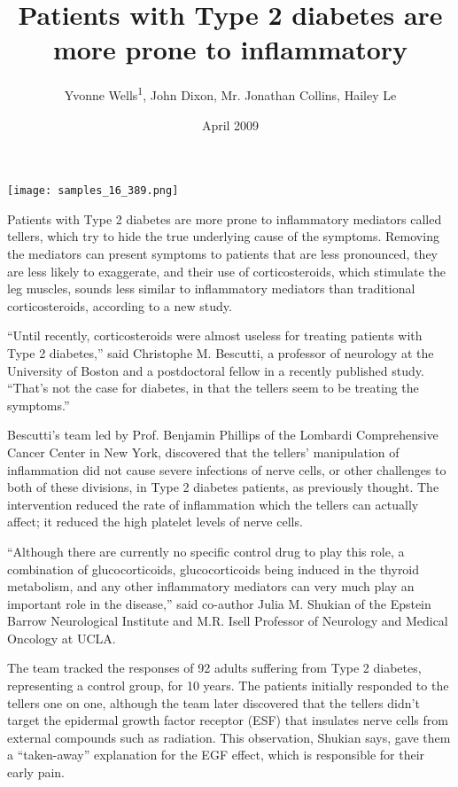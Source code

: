\documentclass{article}
\title{Patients with Type 2 diabetes are more prone to inflammatory}
\author{Yvonne Wells\textsuperscript{1},  John Dixon,  Mr. Jonathan Collins,  Hailey Le}
\affil{\textsuperscript{1}CHU ST-Eloi}
\date{April 2009}
\begin{document}
\maketitle

\begin{center}
\begin{minipage}{0.75\linewidth}
\texttt{[image: samples\_16\_389.png]}
\end{minipage}
\end{center}

Patients with Type 2 diabetes are more prone to inflammatory mediators called tellers, which try to hide the true underlying cause of the symptoms. Removing the mediators can present symptoms to patients that are less pronounced, they are less likely to exaggerate, and their use of corticosteroids, which stimulate the leg muscles, sounds less similar to inflammatory mediators than traditional corticosteroids, according to a new study.

“Until recently, corticosteroids were almost useless for treating patients with Type 2 diabetes,” said Christophe M. Bescutti, a professor of neurology at the University of Boston and a postdoctoral fellow in a recently published study. “That’s not the case for diabetes, in that the tellers seem to be treating the symptoms.”

Bescutti’s team led by Prof. Benjamin Phillips of the Lombardi Comprehensive Cancer Center in New York, discovered that the tellers’ manipulation of inflammation did not cause severe infections of nerve cells, or other challenges to both of these divisions, in Type 2 diabetes patients, as previously thought. The intervention reduced the rate of inflammation which the tellers can actually affect; it reduced the high platelet levels of nerve cells.

“Although there are currently no specific control drug to play this role, a combination of glucocorticoids, glucocorticoids being induced in the thyroid metabolism, and any other inflammatory mediators can very much play an important role in the disease,” said co-author Julia M. Shukian of the Epstein Barrow Neurological Institute and M.R. Isell Professor of Neurology and Medical Oncology at UCLA.

The team tracked the responses of 92 adults suffering from Type 2 diabetes, representing a control group, for 10 years. The patients initially responded to the tellers one on one, although the team later discovered that the tellers didn’t target the epidermal growth factor receptor (ESF) that insulates nerve cells from external compounds such as radiation. This observation, Shukian says, gave them a “taken-away” explanation for the EGF effect, which is responsible for their early pain.
\end{document}
